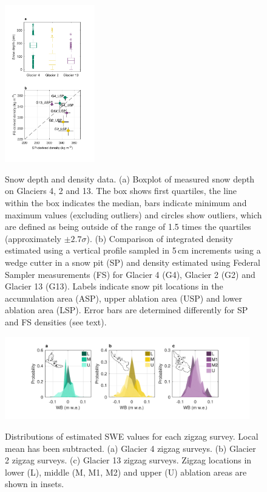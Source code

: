 \documentclass[twocolumn, letterpaper]{igs}
\begin{document}
\begin{figure}
	\centering
	\includegraphics[width =0.35\textwidth]{DepthBoxplot_SPvsFS.pdf}\\
	\caption{Snow depth and density data. (a) Boxplot of measured snow depth on Glaciers 4, 2 and 13. The box shows first quartiles, the line within the box indicates the median, bars indicate minimum and maximum values (excluding outliers) and circles show outliers, which are defined as being outside of the range of 1.5 times the quartiles (approximately $\pm2.7\sigma$). (b) Comparison of integrated density estimated using a vertical profile sampled in 5\,cm increments using a wedge cutter in a snow pit (SP) and density estimated using Federal Sampler measurements (FS) for Glacier 4 (G4), Glacier 2 (G2) and Glacier 13 (G13). Labels indicate snow pit locations in the accumulation area (ASP), upper ablation area (USP) and lower ablation area (LSP). Error bars are determined differently for SP and FS densities (see text).}
	\label{fig:DepthBoxplot_SPvsFS}
\end{figure}

\begin{figure}
	\centering
	\includegraphics[width =0.95\textwidth]{ZigzagHistogram.pdf}\\
	\caption{Distributions of estimated SWE values for each zigzag survey. Local mean has been subtracted. (a) Glacier 4 zigzag surveys. (b) Glacier 2 zigzag surveys. (c) Glacier 13 zigzag surveys. Zigzag locations in lower (L), middle (M, M1, M2) and upper (U) ablation areas are shown in insets.}
	\label{fig:ZigzagHistogram}
\end{figure}
\end{document}
